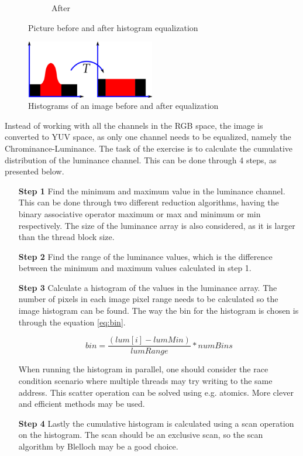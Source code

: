 \begin{figure}[ht]
\begin{subfigure}{.5\textwidth}
		\caption{After}
		\label{fig:ex3-after}
	\end{subfigure}
	\caption{Picture before and after histogram equalization}
	\label{fig:ex3}
\end{figure}  

\begin{figure}[ht]
	\centering
	\includegraphics[width=0.5\textwidth]{figs/exercises/ex3/histogram_eq.png}
	\caption{Histograms of an image before and after equalization \cite{wiki:hist_eq}}	\label{fig:histogram_eq}
\end{figure}  

Instead of working with all the channels in the RGB space, the image is converted to YUV space, as only one channel needs to be equalized, namely the Chrominance-Luminance. The task of the exercise is to calculate the cumulative distribution of the luminance channel. This can be done through 4 steps, as presented below.
\begin{enumerate}
	\item[\textbf{Step 1}]
	Find the minimum and maximum value in the luminance channel. This can be done through two different reduction algorithms, having the binary associative operator maximum or max and minimum or min respectively. The size of the luminance array is also considered, as it is larger than the thread block size.  
	\item[\textbf{Step 2}]
	Find the range of the luminance values, which is the difference between the minimum and maximum values calculated in step 1. 
	\item[\textbf{Step 3}]
	Calculate a histogram of the values in the luminance array. The number of pixels in each image pixel range needs to be calculated so the image histogram can be found. The way the bin for the histogram is chosen is through the equation \cref{eq:bin}.
	
	\begin{equation}
	\label{eq:bin}
		bin = \frac{(lum[i]-lumMin)}{lumRange}*numBins
	\end{equation}
	
	When running the histogram in parallel, one should consider the race condition scenario where multiple threads may try writing to the same address. This scatter operation can be solved using e.g. atomics. More clever and efficient methods may be used. 
	\item[\textbf{Step 4}]
	Lastly the cumulative histogram is calculated using a scan operation on the histogram. The scan should be an exclusive scan, so the scan algorithm by Blelloch may be a good choice.  
\end{enumerate}  